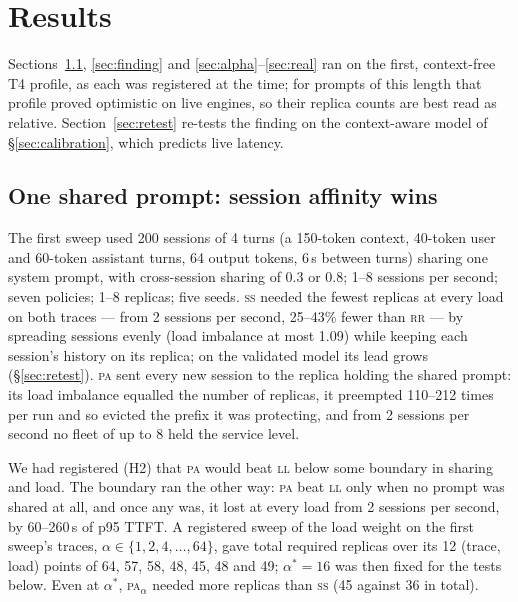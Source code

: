 \documentclass[10pt,twocolumn]{article}
\newcommand{\PA}{\textsc{pa}}
\newcommand{\SSt}{\textsc{ss}}
\newcommand{\RR}{\textsc{rr}}
\newcommand{\LL}{\textsc{ll}}
\begin{document}
\section{Results}

Sections~\ref{sec:one}, \ref{sec:finding} and \ref{sec:alpha}--\ref{sec:real} ran on the first,
context-free T4 profile, as each was registered at the time; for prompts of this length that profile
proved optimistic on live engines, so their replica counts are best read as relative. Section~\ref{sec:retest}
re-tests the finding on the context-aware model of \S\ref{sec:calibration}, which predicts live
latency.

\subsection{One shared prompt: session affinity wins}\label{sec:one}

The first sweep used 200 sessions of 4 turns (a 150-token context, 40-token user and 60-token
assistant turns, 64 output tokens, 6\,s between turns) sharing one system prompt, with cross-session
sharing of 0.3 or 0.8; 1--8 sessions per second; seven policies; 1--8 replicas; five seeds. \SSt{}
needed the fewest replicas at every load on both traces --- from 2 sessions per second, 25--43\% fewer
than \RR{} --- by spreading
sessions evenly (load imbalance at most 1.09) while keeping each session's history on its replica;
on the validated model its lead grows (\S\ref{sec:retest}).
\PA{} sent every new session to the replica holding the shared prompt: its load imbalance equalled
the number of replicas, it preempted 110--212 times per run and so evicted the prefix it was
protecting, and from 2 sessions per second no fleet of up to 8 held the service level.

We had registered (H2) that \PA{} would beat \LL{} below some boundary in sharing and load. The
boundary ran the other way: \PA{} beat \LL{} only when no prompt was shared at all, and once any was,
it lost at every load from 2 sessions per second, by 60--260\,s of p95 TTFT. A registered sweep of the
load weight on the first sweep's traces, $\alpha \in \{1, 2, 4, \ldots, 64\}$, gave total required
replicas over its 12 (trace, load) points of 64, 57, 58, 48, 45, 48 and 49; $\alpha^* = 16$ was then
fixed for the tests below. Even at $\alpha^*$, \PA$_\alpha$ needed more replicas than \SSt{} (45
against 36 in total).
\end{document}
